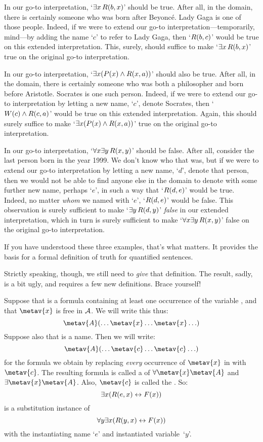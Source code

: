In our go-to interpretation, `$\exists x\, \mathord{R}(b,x)$' should be true. After all, in the domain, there is certainly someone who was born after Beyonc\'e. Lady Gaga is one of those people. Indeed, if we were to extend our go-to interpretation---temporarily, mind---by adding the name `$c$' to refer to Lady Gaga, then `$\mathord{R}(b,c)$' would be true on this extended interpretation. This, surely, should suffice to make `$\exists x\, \mathord{R}(b,x)$' true on the original go-to interpretation. 

In our go-to interpretation, `$\exists x (\mathord{P}(x) \wedge \mathord{R}(x,a))$' should also be true. After all, in the domain, there is certainly someone who was both a philosopher and born before Aristotle. Socrates is one such person. Indeed, if we were to extend our go-to interpretation by letting a new name, `$c$', denote Socrates, then `$\mathord{W}(c) \wedge \mathord{R}(c,a)$' would be true on this extended interpretation. Again, this should surely suffice to make `$\exists x (\mathord{P}(x) \wedge \mathord{R}(x,a))$' true on the original go-to interpretation. 

In our go-to interpretation, `$\forall x \exists y\, \mathord{R}(x,y)$' should be false. After all, consider the last person born in the year 1999. We don't know who that was, but if we were to extend our go-to interpretation by letting a new name, `$d$', denote that person, then we would not be able to find anyone else in the domain to denote with some further new name, perhaps `$e$', in such a way that `$\mathord{R}(d,e)$' would be true. Indeed, no matter \emph{whom} we named with `$e$', `$\mathord{R}(d,e)$' would be false. This observation is surely sufficient to make `$\exists y\, \mathord{R}(d,y)$' \emph{false} in our extended interpretation, which in turn is surely sufficient to make `$\forall x \exists y\, \mathord{R}(x,y)$' false on the original go-to interpretation.

If you have understood these three examples, that's what matters. It provides the basis for a formal definition of truth for quantified sentences. 

Strictly speaking, though, we still need to \emph{give} that definition. The result, sadly, is a bit ugly, and requires a few new definitions. Brace yourself!

Suppose that  is a formula containing at least one occurrence of the variable , and that $\metav{x}$ is free in $\mathcal{A}$. We will write this thus:
$$\metav{A}(\ldots \metav{x} \ldots \metav{x} \ldots)$$
Suppose also that  is a name. Then we will write:
$$\metav{A}(\ldots \metav{c} \ldots \metav{c} \ldots)$$
for the formula we obtain by replacing \emph{every} occurrence of $\metav{x}$ in  with~$\metav{c}$. The resulting formula is called a  of $\forall \metav{x}\metav{A}$ and $\exists\metav{x}\metav{A}$.  Also, $\metav{c}$ is called the . So:
	$$\exists x (\mathord{R}(e,x) \leftrightarrow \mathord{F}(x))$$
is a substitution instance of 
	$$\forall y \exists x (\mathord{R}(y,x) \leftrightarrow \mathord{F}(x))$$
with the instantiating name `$e$' and instantiated variable~`$y$'.

